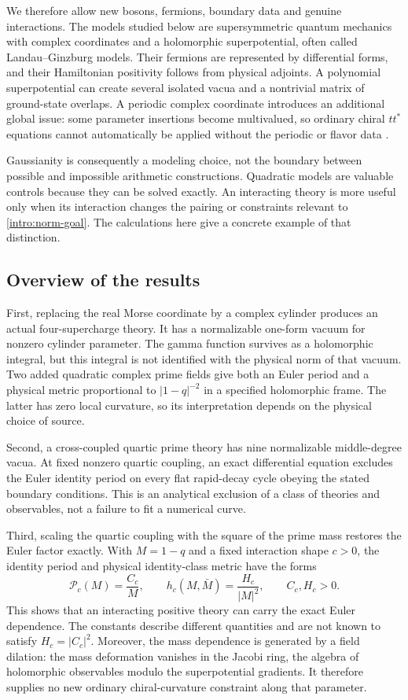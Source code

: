 We therefore allow new bosons, fermions, boundary data and genuine interactions. The models studied below are supersymmetric quantum mechanics with complex coordinates and a holomorphic superpotential, often called Landau--Ginzburg models. Their fermions are represented by differential forms, and their Hamiltonian positivity follows from physical adjoints. A polynomial superpotential can create several isolated vacua and a nontrivial matrix of ground-state overlaps. A periodic complex coordinate introduces an additional global issue: some parameter insertions become multivalued, so ordinary chiral $tt^*$ equations cannot automatically be applied without the periodic or flavor data \cite{CGV}.

Gaussianity is consequently a modeling choice, not the boundary between possible and impossible arithmetic constructions. Quadratic models are valuable controls because they can be solved exactly. An interacting theory is more useful only when its interaction changes the pairing or constraints relevant to \eqref{intro:norm-goal}. The calculations here give a concrete example of that distinction.

\subsection{Overview of the results}
First, replacing the real Morse coordinate by a complex cylinder produces an actual four-supercharge theory. It has a normalizable one-form vacuum for nonzero cylinder parameter. The gamma function survives as a holomorphic integral, but this integral is not identified with the physical norm of that vacuum. Two added quadratic complex prime fields give both an Euler period and a physical metric proportional to $|1-q|^{-2}$ in a specified holomorphic frame. The latter has zero local curvature, so its interpretation depends on the physical choice of source.

Second, a cross-coupled quartic prime theory has nine normalizable middle-degree vacua. At fixed nonzero quartic coupling, an exact differential equation excludes the Euler identity period on every flat rapid-decay cycle obeying the stated boundary conditions. This is an analytical exclusion of a class of theories and observables, not a failure to fit a numerical curve.

Third, scaling the quartic coupling with the square of the prime mass restores the Euler factor exactly. With $M=1-q$ and a fixed interaction shape $c>0$, the identity period and physical identity-class metric have the forms
\begin{equation}\label{intro:interacting-success}
\mathcal P_c(M)=\frac{C_c}{M},\qquad
h_c(M,\bar M)=\frac{H_c}{|M|^2},\qquad C_c,H_c>0.
\end{equation}
This shows that an interacting positive theory can carry the exact Euler dependence. The constants describe different quantities and are not known to satisfy $H_c=|C_c|^2$. Moreover, the mass dependence is generated by a field dilation: the mass deformation vanishes in the Jacobi ring, the algebra of holomorphic observables modulo the superpotential gradients. It therefore supplies no new ordinary chiral-curvature constraint along that parameter.

